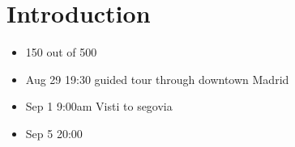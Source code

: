 \chapter{Introduction}

\begin{itemize}
  \item 150 out of 500
  \item Aug 29 19:30 guided tour through downtown Madrid
  \item Sep 1 9:00am Visti to segovia
  \item Sep 5 20:00
\end{itemize}
